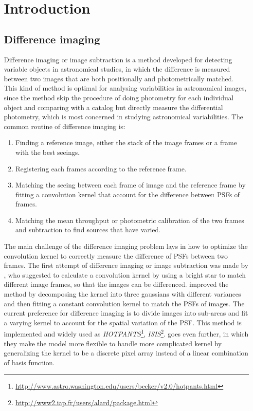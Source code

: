\documentclass[12pt, preprint]{aastex}
\newcommand{\project}[1]{\textsl{#1}}
\begin{document}
\section{Introduction}

\subsection{Difference imaging}
Difference imaging or image subtraction is a method developed for detecting variable objects in astronomical studies, in which the difference is measured between two images that are both positionally and photometrically matched. This kind of method is optimal for analysing variabilities in astronomical images, since the method skip the procedure of doing photometry for each individual object and comparing with a catalog but directly measure the differential photometry, which is most concerned in studying astronomical variabilities.
The common routine of difference imaging is:
\begin{enumerate}
\item
Finding a reference image, either the stack of the image frames or a frame with the best seeings.
\item
Registering each frames according to the reference frame.
\item
Matching the seeing between each frame of image and the reference frame by fitting a convolution kernel that account for the difference between PSFs of frames.
\item
Matching the mean throughput or photometric calibration of the two frames and subtraction to find sources that have varied.
\end{enumerate}
The main challenge of the difference imaging problem lays in how to optimize the convolution kernel to correctly measure the difference of PSFs between two frames.
The first attempt of difference imaging or image subtraction was made by \cite{imagesub1}, who suggested to calculate a convolution kernel by using a bright star to match different image frames, so that the images can be differenced. 
\cite{alard} improved the method by decomposing the kernel into three gaussians with different variances and then fitting a constant convolution kernel to match the PSFs of images.
The current preference for difference imaging \citep{varyingkernel} is to divide images into sub-areas and fit a varying kernel to account for the spatial variation of the PSF. This method is implemented and widely used as \project{HOTPANTS}\footnote{\url{http://www.astro.washington.edu/users/becker/v2.0/hotpants.html}}, \project{ISIS}\footnote{\url{http://www2.iap.fr/users/alard/package.html}}. 
\cite{bramich} goes even further,  in which they make the model more flexible to handle more complicated kernel by generalizing the kernel to be a discrete pixel array instead of a linear combination of basis function.  
\end{document}
